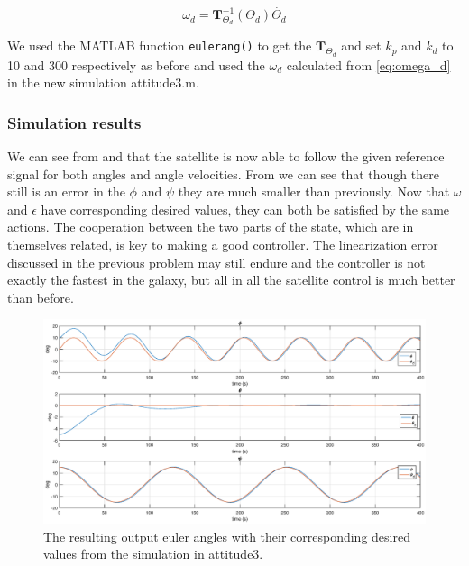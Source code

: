 \begin{equation}
    \omega_d = \mathbf{T}_{\Theta_d}^{-1}(\Theta_d)\dot{\Theta_d}
    \label{eq:omega_d}
\end{equation}

We used the MATLAB function \texttt{eulerang()} to get the $\mathbf{T}_{\Theta_d}$ and set $k_p$ and $k_d$ to 10 and 300 respectively as before and used the $\omega_d$ calculated from \eqref{eq:omega_d} in the new simulation {\color{blue} attitude3.m}.

\subsubsection*{Simulation results}

We can see from  and  that the satellite is now able to follow the given reference signal for both angles and angle velocities. From  we can see that though there still is an error in the $\phi$ and $\psi$ they are much smaller than previously. Now that $\omega$ and $\epsilon$ have corresponding desired values, they can both be satisfied by the same actions. The cooperation between the two parts of the state, which are in themselves related, is key to making a good controller. The linearization error discussed in the previous problem may still endure and the controller is not exactly the fastest in the galaxy, but all in all the satellite control is much better than before.

\begin{figure}
	\centering
	\includegraphics[width=1.00\textwidth]{figures/3_euler.eps}
	\caption{The resulting output euler angles with their corresponding desired values from the simulation in attitude3.}
\label{fig:sim_attitude3_euler}
\end{figure}

